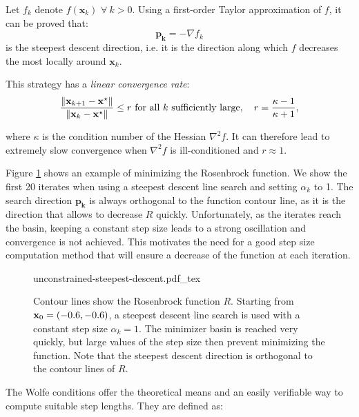 Let $f_k$ denote $f(\mathbf{x}_k)$ $\forall~k > 0$. Using a
first-order Taylor approximation of $f$, it can be proved that:
\begin{equation}
\mathbf{p_k} = -\nabla f_k
\end{equation}
is the steepest descent direction, i.e. it is the direction along
which $f$ decreases the most locally around $\mathbf{x}_k$.

This strategy has a \emph{linear convergence rate}:
\begin{equation}
\frac{\left\lVert \mathbf{x}_{k+1}-\mathbf{x}^{\star} \right\rVert}{\left\lVert \mathbf{x}_k-\mathbf{x}^{\star} \right\rVert}
\le r \text{ for all } k \text{ sufficiently large}, \quad
r=\frac{\kappa-1}{\kappa+1},
\end{equation}

where $\kappa$ is the condition number of the Hessian $\nabla^2 f$.
It can therefore lead to extremely slow convergence when $\nabla^2 f$
is ill-conditioned and $r \approx 1$.

Figure \ref{fig:chap3-unconstrained-steepest-descent} shows an example
of minimizing the Rosenbrock function. We show the first 20 iterates
when using a steepest descent line search and setting $\alpha_k$ to
1. The search direction $\mathbf{p_k}$ is always orthogonal to the
function contour line, as it is the direction that allows to decrease
$R$ quickly. Unfortunately, as the iterates reach the basin, keeping a
constant step size leads to a strong oscillation and convergence is
not achieved. This motivates the need for a good step size computation
method that will ensure a decrease of the function at each iteration.

\begin{figure}
  \centering
      {\def\svgwidth{0.8\linewidth}
        {\footnotesize
          
                     {unconstrained-steepest-descent.pdf_tex}
        }
      }
      \caption{Contour lines show the Rosenbrock function
        $R$. Starting from $\mathbf{x}_0=(-0.6,-0.6)$, a steepest
        descent line search is used with a constant step size
        $\alpha_k=1$. The minimizer basin is reached very quickly,
        but large values of the step size then prevent minimizing the
        function. Note that the steepest descent direction is
        orthogonal to the contour lines of $R$.}
      \label{fig:chap3-unconstrained-steepest-descent}
\end{figure}

The Wolfe conditions offer the theoretical means and an easily
verifiable way to compute suitable step lengths. They are defined as:

